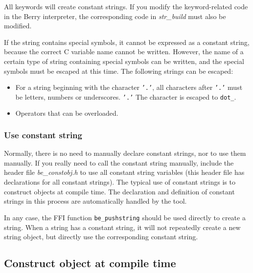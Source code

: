 All keywords will create constant strings. If you modify the keyword-related code in the Berry interpreter, the corresponding code in \textsl{str\_build} must also be modified.

If the string contains special symbols, it cannot be expressed as a constant string, because the correct C variable name cannot be written. However, the name of a certain type of string containing special symbols can be written, and the special symbols must be escaped at this time. The following strings can be escaped:\begin{itemize}
    \item For a string beginning with the character \texttt{'.'}, all characters after \texttt{'.'} must be letters, numbers or underscores. \texttt{'.'} The character is escaped to \texttt{dot\_}.
    \item Operators that can be overloaded.
\end{itemize}

\subsubsection {Use constant string}

Normally, there is no need to manually declare constant strings, nor to use them manually. If you really need to call the constant string manually, include the header file \textsl{be\_constobj.h} to use all constant string variables (this header file has declarations for all constant strings). The typical use of constant strings is to construct objects at compile time. The declaration and definition of constant strings in this process are automatically handled by the tool.

In any case, the FFI function \texttt{be\_pushstring} should be used directly to create a string. When a string has a constant string, it will not repeatedly create a new string object, but directly use the corresponding constant string.

\subsection {Construct object at compile time}

